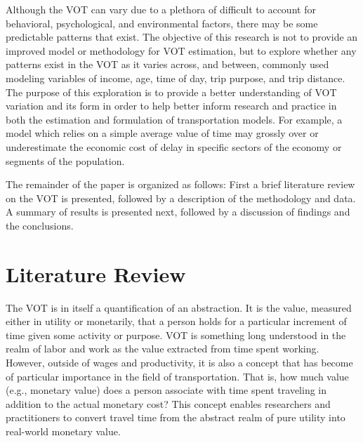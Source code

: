 \documentclass[numbered]{trbunofficial}\usepackage[]{graphicx}\usepackage[]{color}
\begin{document}
Although the VOT can vary due to a plethora of difficult to account for behavioral, psychological, and environmental factors, there may be some predictable patterns that exist. The objective of this research is not to provide an improved model or methodology for VOT estimation, but to explore whether any patterns exist in the VOT as it varies across, and between, commonly used modeling variables of income, age, time of day, trip purpose, and trip distance. The purpose of this exploration is to provide a better understanding of VOT variation and its form in order to help better inform research and practice in both the estimation and formulation of transportation models. For example, a model which relies on a simple average value of time may grossly over or underestimate the economic cost of delay in specific sectors of the economy or segments of the population.

The remainder of the paper is organized as follows: First a brief literature review on the VOT is presented, followed by a description of the methodology and data. A summary of results is presented next, followed by a discussion of findings and the conclusions. 


\section{Literature Review}\label{sec:litreview}

The VOT is in itself a quantification of an abstraction. It is the value, measured either in utility or monetarily, that a person holds for a particular increment of time given some activity or purpose. VOT is something long understood in the realm of labor and work as the value extracted from time spent working. However, outside of wages and productivity, it is also a concept that has become of particular importance in the field of transportation. That is, how much value (e.g., monetary value) does a person associate with time spent traveling in addition to the actual monetary cost? This concept enables researchers and practitioners to convert travel time from the abstract realm of pure utility into real-world monetary value.
\end{document}
